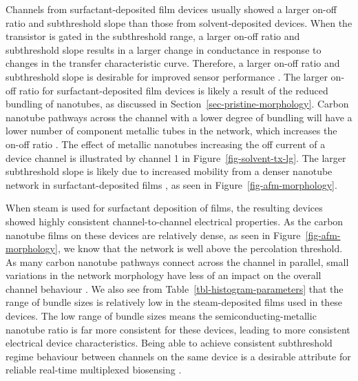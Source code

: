 \documentclass[
  a4paper,
]{scrbook}
\begin{document}
Channels from surfactant-deposited film devices usually showed a larger
on-off ratio and subthreshold slope than those from solvent-deposited
devices. When the transistor is gated in the subthreshold range, a
larger on-off ratio and subthreshold slope results in a larger change in
conductance in response to changes in the transfer characteristic curve.
Therefore, a larger on-off ratio and subthreshold slope is desirable for
improved sensor performance \autocite{Kauffman2008,Heller2009,Gao2010}.
The larger on-off ratio for surfactant-deposited film devices is likely
a result of the reduced bundling of nanotubes, as discussed in
Section~\ref{sec-pristine-morphology}. Carbon nanotube pathways across
the channel with a lower degree of bundling will have a lower number of
component metallic tubes in the network, which increases the on-off
ratio \autocite{LeMieux2008,Rouhi2011,Murugathas2018}. The effect of
metallic nanotubes increasing the off current of a device channel is
illustrated by channel 1 in Figure~\ref{fig-solvent-tx-lg}. The larger
subthreshold slope is likely due to increased mobility from a denser
nanotube network in surfactant-deposited films \autocite{Rouhi2011}, as
seen in Figure~\ref{fig-afm-morphology}.

When steam is used for surfactant deposition of films, the resulting
devices showed highly consistent channel-to-channel electrical
properties. As the carbon nanotube films on these devices are relatively
dense, as seen in Figure~\ref{fig-afm-morphology}, we know that the
network is well above the percolation threshold. As many carbon nanotube
pathways connect across the channel in parallel, small variations in the
network morphology have less of an impact on the overall channel
behaviour \autocite{Murugathas2018}. We also see from
Table~\ref{tbl-histogram-parameters} that the range of bundle sizes is
relatively low in the steam-deposited films used in these devices. The
low range of bundle sizes means the semiconducting-metallic nanotube
ratio is far more consistent for these devices, leading to more
consistent electrical device characteristics. Being able to achieve
consistent subthreshold regime behaviour between channels on the same
device is a desirable attribute for reliable real-time multiplexed
biosensing \autocite{Kauffman2008,Heller2009,Gao2010}.
\end{document}
